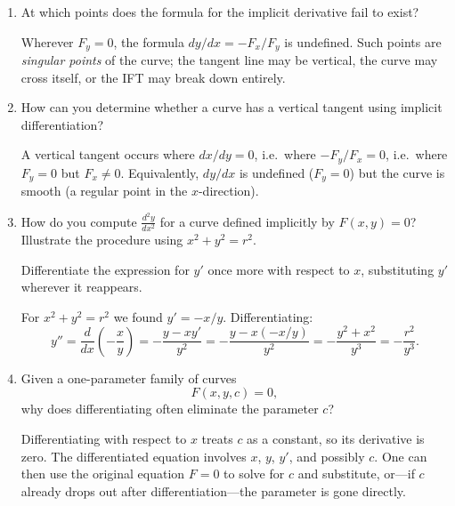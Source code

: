 \documentclass{essay}
\begin{document}
\begin{enumerate}[leftmargin=*, itemsep=8pt]
  \item At which points does the formula for the implicit derivative
    fail to exist?

    \begin{answer} Wherever $F_y = 0$, the formula $dy/dx =
      -F_x/F_y$ is undefined.  Such points are \emph{singular points}
      of the curve; the tangent line may be vertical, the curve may
      cross itself, or the IFT may break down entirely.
    \end{answer}

  \item How can you determine whether a curve has a vertical tangent
    using implicit differentiation?

    \begin{answer} A vertical tangent occurs where $dx/dy = 0$,
      i.e.\ where $-F_y/F_x = 0$, i.e.\ where $F_y = 0$ but $F_x \neq
      0$.  Equivalently, $dy/dx$ is undefined ($F_y=0$) but the curve
      is smooth (a regular point in the $x$-direction).
    \end{answer}

  \item How do you compute $\frac{d^2y}{dx^2}$ for a curve defined
    implicitly by $F(x,y)=0$? Illustrate the procedure using $x^2+y^2=r^2$.

    \begin{answer} Differentiate the expression for $y'$ once more
      with respect to $x$, substituting $y'$ wherever it reappears.

      For $x^2+y^2=r^2$ we found $y'=-x/y$.  Differentiating:
      \[
        y'' = \frac{d}{dx}\!\left(-\frac{x}{y}\right)
        = -\frac{y - x y'}{y^2}
        = -\frac{y - x(-x/y)}{y^2}
        = -\frac{y^2 + x^2}{y^3}
        = -\frac{r^2}{y^3}.
      \]
    \end{answer}

  \item Given a one-parameter family of curves \[ F(x,y,c)=0, \] why
    does differentiating often eliminate the parameter \(c\)?

    \begin{answer} Differentiating with respect to $x$ treats $c$
      as a constant, so its derivative is zero.  The differentiated
      equation involves $x$, $y$, $y'$, and possibly $c$.  One can then
      use the original equation $F=0$ to solve for $c$ and substitute,
      or---if $c$ already drops out after differentiation---the
      parameter is gone directly.
    \end{answer}


\end{enumerate}
\end{document}
